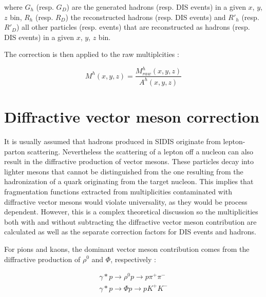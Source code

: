 where $G_h$ (resp. $G_D$) are the generated hadrons (resp. DIS events) in a given $x$, $y$, $z$ bin, $R_h$ (resp. $R_D$) the reconstructed hadrons (resp. DIS events) and $R'_h$ (resp. $R'_D$) all other particles (resp. events) that are reconstructed as hadrons (resp. DIS events) in a given $x$, $y$, $z$ bin.

The correction is then applied to the raw multiplcities :

\begin{equation}
  M^h(x,y,z) = \frac{M^h_{raw}(x,y,z)}{A^h(x,y,z)}
\end{equation}

\newpage

\section{Diffractive vector meson correction} \label{sec:DVMf}

It is usually assumed that hadrons produced in SIDIS originate from lepton-parton scattering. Nevertheless the scattering of a lepton off a nucleon can also result in the diffractive production of vector mesons. These particles decay into lighter mesons that cannot be distinguished from the one resulting from the hadronization of a quark originating from the target nucleon. This implies that fragmentation functions extracted from multiplicities contaminated with diffractive vector mesons would violate universality, as they would be process dependent. However, this is a complex theoretical discussion so the multiplicities both with and without subtracting the diffractive vector meson contribution are calculated as well as the separate correction factors for DIS events and hadrons.

For pions and kaons, the dominant vector meson contribution comes from the diffractive production of $\rho^0$ and $\Phi$, respectively :

\begin{equation}
    \begin{split}
      \gamma * p \rightarrow \rho^0 p \rightarrow p\pi^+\pi^- \\
      \gamma * p \rightarrow \Phi p \rightarrow pK^+K^-
    \end{split}
\end{equation}

